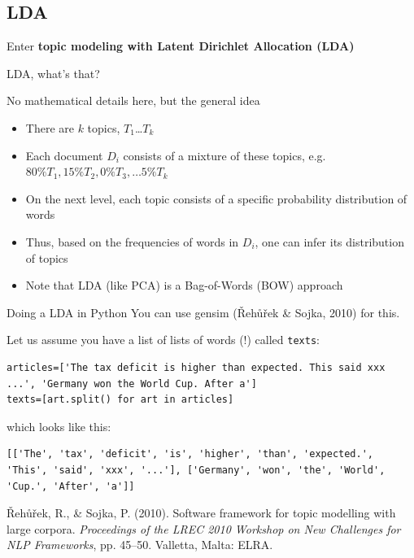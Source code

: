 \documentclass{beamer}
\begin{document}
\subsection{LDA}


\begin{frame}{}
	Enter \textbf{topic modeling with Latent Dirichlet Allocation (LDA)}
\end{frame}






\begin{frame}{LDA, what's that?}
	\begin{block}{No mathematical details here, but the general idea}
		\begin{itemize}
			\item There are $k$ topics, $T_1$\ldots$T_k$
			\item Each document $D_i$ consists of a mixture of these topics, e.g.$80\% T_1, 15\% T_2, 0\% T_3, \ldots 5\% T_k $
			\item On the next level, each topic consists of a specific probability distribution of words
			\item Thus, based on the frequencies of words in $D_i$, one can infer its distribution of topics
			\item Note that LDA (like PCA) is a Bag-of-Words (BOW) approach
		\end{itemize}
	\end{block}
	
\end{frame}




\begin{frame}[fragile]{Doing a LDA in Python}
You can use gensim ({\v R}eh{\r u}{\v r}ek \& Sojka, 2010) for this.

Let us assume you have a list of lists of words (!) called \texttt{texts}:

\begin{lstlisting}
articles=['The tax deficit is higher than expected. This said xxx ...', 'Germany won the World Cup. After a']
texts=[art.split() for art in articles]
\end{lstlisting}
which looks like this:
\begin{lstlisting}
[['The', 'tax', 'deficit', 'is', 'higher', 'than', 'expected.', 'This', 'said', 'xxx', '...'], ['Germany', 'won', 'the', 'World', 'Cup.', 'After', 'a']]
\end{lstlisting}

\tiny{{\v R}eh{\r u}{\v r}ek, R., \& Sojka, P. (2010). Software framework for topic modelling with large corpora. \emph{Proceedings of the LREC 2010 Workshop on New Challenges for NLP Frameworks}, pp. 45–50. Valletta, Malta: ELRA. }

\end{frame}
\end{document}
